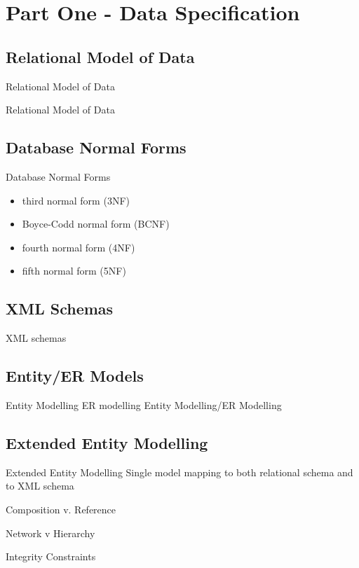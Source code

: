 \documentclass{beamer}
\renewcommand{\erpictureFolder}[0]{../SharedPictures}
\begin{document}
\section{Part One - Data Specification}
\subsection{Relational Model of Data}
\begin{frame}{Relational Model of Data}
\scalebox{0.6}{

}
\end{frame}
\begin{frame}{Relational Model of Data}
\scalebox{0.6}{

}
\end{frame}
\subsection{Database Normal Forms}
\begin{frame}{Database Normal Forms}
\begin{itemize}
\item third normal form (3NF)
\item Boyce-Codd normal form (BCNF)
\item fourth normal form (4NF)
\item fifth normal form (5NF)
\end{itemize}
\end{frame}

\subsection{XML Schemas}
\begin{frame}{XML schemas}
\end{frame}

\subsection{Entity/ER Models}
\begin{frame}{Entity Modelling ER modelling}
Entity Modelling/ER Modelling
\end{frame}
\subsection{Extended Entity Modelling}

\begin{frame}{Extended Entity Modelling}
Single model mapping to both relational schema and to XML schema
\end{frame}
\begin{frame}{Composition v. Reference}
\end{frame}
\begin{frame}{Network v Hierarchy}
\end{frame}
\begin{frame}{Integrity Constraints}
\end{frame}
\end{document}
